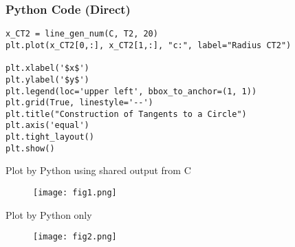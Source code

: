\documentclass{beamer}
\begin{document}
\begin{frame}[fragile]
\frametitle{Python Code (Direct)}
\begin{lstlisting}
x_CT2 = line_gen_num(C, T2, 20)
plt.plot(x_CT2[0,:], x_CT2[1,:], "c:", label="Radius CT2")

plt.xlabel('$x$')
plt.ylabel('$y$')
plt.legend(loc='upper left', bbox_to_anchor=(1, 1))
plt.grid(True, linestyle='--')
plt.title("Construction of Tangents to a Circle")
plt.axis('equal')
plt.tight_layout()
plt.show()
\end{lstlisting}
\end{frame}

\begin{frame}{Plot by Python using shared output from C}
\begin{figure}[H]
\centering
\texttt{[image: fig1.png]}
\caption{}
\label{fig:1}
\end{figure}
\end{frame}

\begin{frame}{Plot by Python only}
\begin{figure}[H]
\centering
\texttt{[image: fig2.png]}
\caption{}
\label{fig:2}
\end{figure}
\end{frame}
\end{document}
